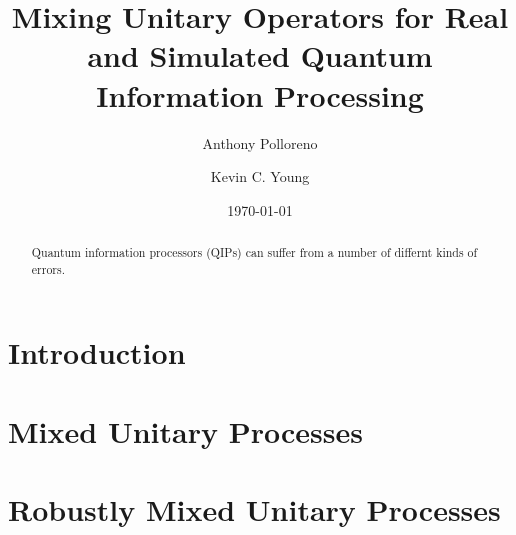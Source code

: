 \documentclass[aps,nofootinbib,pra,notitlepage,twocolumn]{revtex4-1}
\begin{document}
\title{Mixing Unitary Operators for Real and Simulated Quantum Information Processing}

\author{Anthony Polloreno}

\author{Kevin C. Young}

\date{\today}

\begin{abstract}
Quantum information processors (QIPs) can suffer from a number of differnt kinds of errors.
\end{abstract}

\pacs{}

\maketitle

\section{Introduction}
\label{sec:introduction}

\section{Mixed Unitary Processes}
\label{sec:mixed_unitary_processes}


\section{Robustly Mixed Unitary Processes}
\label{sec:robustly_mixed}




\end{document}
